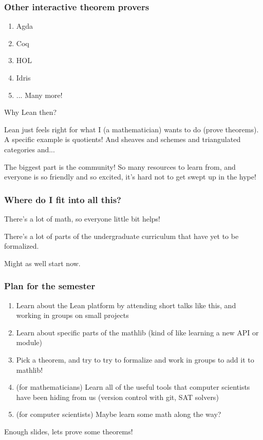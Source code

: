 \documentclass{beamer}
\begin{document}
\begin{frame}
    \frametitle{Other interactive theorem provers}
    \begin{enumerate}
        \item Agda
        \item Coq
        \item HOL
        \item Idris
        \item ... Many more!
    \end{enumerate}
    \vspace{20pt}
    \pause
    Why Lean then? 
    
    \vspace{20pt}
    \pause
    Lean just feels right for what I (a mathematician) wants to do (prove theorems). \pause A specific example is quotients! \pause And sheaves \pause and schemes \pause and triangulated categories \pause and...

    \vspace{20pt}
    \pause
    The biggest part is the community! So many resources to learn from, and everyone is so friendly and so excited, it's hard not to get swept up in the hype!
\end{frame}

\begin{frame}
    \frametitle{Where do I fit into all this?}
    There's a lot of math, so everyone little bit helps!

    \vspace{20pt}
    \pause
    There's a lot of parts of the undergraduate curriculum that have yet to be formalized.

    \vspace{20pt}
    \pause
    Might as well start now. 
\end{frame}

\begin{frame}
    \frametitle{Plan for the semester}
    \begin{enumerate}
        \item Learn about the Lean platform by attending short talks like this, and working in groups on small projects
        \item Learn about specific parts of the mathlib (kind of like learning a new API or module)
        \item Pick a theorem, and try to try to formalize and work in groups to add it to mathlib!
        \pause
        \item<2-> (for mathematicians) Learn all of the useful tools that computer scientists have been hiding from us (version control with git, SAT solvers)
        \item<2-> (for computer scientists) Maybe learn some math along the way? 
    \end{enumerate}
\end{frame}

\begin{frame}
    Enough slides, lets prove some theorems!
\end{frame}
        
\end{document}
